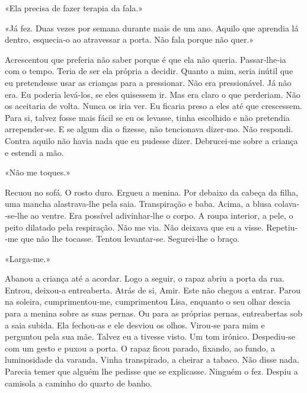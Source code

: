 «Ela precisa de fazer terapia da fala.»

«Já fez. Duas vezes por semana durante mais de um ano. Aquilo que
aprendia lá dentro, esquecia­‑o ao atravessar a porta. Não fala porque
não quer.»

Acrescentou que preferia não saber porque é que ela não queria.
Passar­‑lhe­‑ia com o tempo. Teria de ser ela própria a decidir. Quanto
a mim, seria inútil que eu pretendesse usar as crianças para a
pressionar. Não era pressionável. Já não era. Eu poderia levá­‑los, se
eles quisessem ir. Mas era claro o que perderiam. Não os aceitaria de
volta. Nunca os iria ver. Eu ficaria preso a eles até que crescessem.
Para si, talvez fosse mais fácil se eu os levasse, tinha escolhido e não
pretendia arrepender­‑se. E se algum dia o fizesse, não tencionava
dizer­‑mo. Não respondi. Contra aquilo não havia nada que eu pudesse
dizer. Debrucei­‑me sobre a criança e estendi a mão.

«Não me toques.»

Recuou no sofá. O rosto duro. Ergueu a menina. Por debaixo da cabeça da
filha, uma mancha alastrava­‑lhe pela saia. Transpiração e baba. Acima,
a blusa colava­‑se­‑lhe ao ventre. Era possível adivinhar­‑lhe o corpo.
A roupa interior, a pele, o peito dilatado pela respiração. Não me via.
Não deixava que eu a visse. Repetiu­‑me que não lhe tocasse. Tentou
levantar­‑se. Segurei­‑lhe o braço.

«Larga­‑me.»

Abanou a criança até a acordar. Logo a seguir, o rapaz abriu a porta da
rua. Entrou, deixou­‑a entreaberta. Atrás de si, Amir. Este não chegou a
entrar. Parou na soleira, cumprimentou­‑me, cumprimentou Lisa, enquanto
o seu olhar descia para a menina sobre as suas pernas. Ou para as
próprias pernas, entreabertas sob a saia subida. Ela fechou­‑as e ele
desviou os olhos. Virou­‑se para mim e perguntou pela sua mãe. Talvez eu
a tivesse visto. Um tom irónico. Despediu­‑se com um gesto e puxou a
porta. O rapaz ficou parado, fixando, ao fundo, a luminosidade da
varanda. Vinha transpirado, a cheirar a tabaco. Não disse nada. Parecia
temer que alguém lhe pedisse que se explicasse. Ninguém o fez. Despiu a
camisola a caminho do quarto de banho.

